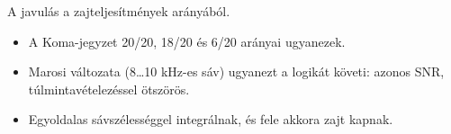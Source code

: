 \begin{center}\end{center}

A javulás a zajteljesítmények arányából.

\begin{center}\end{center}
\begin{eredmeny}

\begin{center}\end{center}
\end{eredmeny}
\begin{tipp}[Ellenőrzés]
\begin{itemize}
\item A Koma-jegyzet 20/20, 18/20 és 6/20 arányai ugyanezek.
\item Marosi változata (8\ldots{}10 kHz-es sáv) ugyanezt a logikát követi: azonos SNR, túlmintavételezéssel ötszörös.
\end{itemize}
\end{tipp}
\begin{figyelem}
\begin{itemize}
\item Egyoldalas sávszélességgel integrálnak, és fele akkora zajt kapnak.
\end{itemize}
\end{figyelem}


